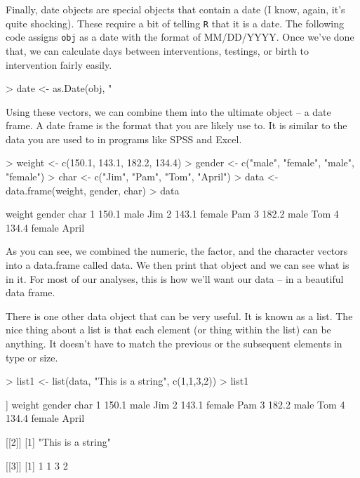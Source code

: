 \documentclass{book}
\begin{document}
Finally, date objects are special objects that contain a date (I know, again, it's quite shocking). These require a bit of telling \verb|R| that it is a date. The following code assigns \verb|obj| as a date with the format of MM/DD/YYYY. Once we've done that, we can calculate days between interventions, testings, or birth to intervention fairly easily.

\begin{Schunk}
\begin{Sinput}
> date <- as.Date(obj, "%m/%d/%Y")
\end{Sinput}
\end{Schunk}

Using these vectors, we can combine them into the ultimate object -- a date frame. A date frame is the format that you are likely use to. It is similar to the data you are used to in programs like SPSS and Excel. 

\begin{Schunk}
\begin{Sinput}
> weight <- c(150.1, 143.1, 182.2, 134.4)
> gender <- c("male", "female", "male", "female")
> char <- c("Jim", "Pam", "Tom", "April")
> data <- data.frame(weight, gender, char)
> data
\end{Sinput}
\begin{Soutput}
  weight gender  char
1  150.1   male   Jim
2  143.1 female   Pam
3  182.2   male   Tom
4  134.4 female April
\end{Soutput}
\end{Schunk}

As you can see, we combined the numeric, the factor, and the character vectors into a data.frame called data. We then print that object and we can see what is in it. For most of our analyses, this is how we'll want our data -- in a beautiful data frame.

There is one other data object that can be very useful. It is known as a list. The nice thing about a list is that each element (or thing within the list) can be anything. It doesn't have to match the previous or the subsequent elements in type or size.

\begin{Schunk}
\begin{Sinput}
> list1 <- list(data, "This is a string", c(1,1,3,2))
> list1
\end{Sinput}
\begin{Soutput}
[[1]]
  weight gender  char
1  150.1   male   Jim
2  143.1 female   Pam
3  182.2   male   Tom
4  134.4 female April

[[2]]
[1] "This is a string"

[[3]]
[1] 1 1 3 2
\end{Soutput}
\end{Schunk}
\end{document}
